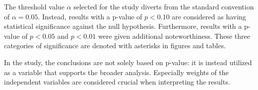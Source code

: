 The threshold value $\alpha$ selected for the study diverts from the standard convention of $\alpha=0.05$. Instead, results with a p-value of $p<0.10$ are considered as having statistical significance against the null hypothesis. Furthermore, results with a p-value of $p<0.05$ and $p<0.01$ were given additional noteworthiness. These three categories of significance are denoted with asterisks in figures and tables. 

In the study, the conclusions are not solely based on p-value: it is instead utilized as a variable that supports the broader analysis. Especially weights of the independent variables are considered crucial when interpreting the results. 

